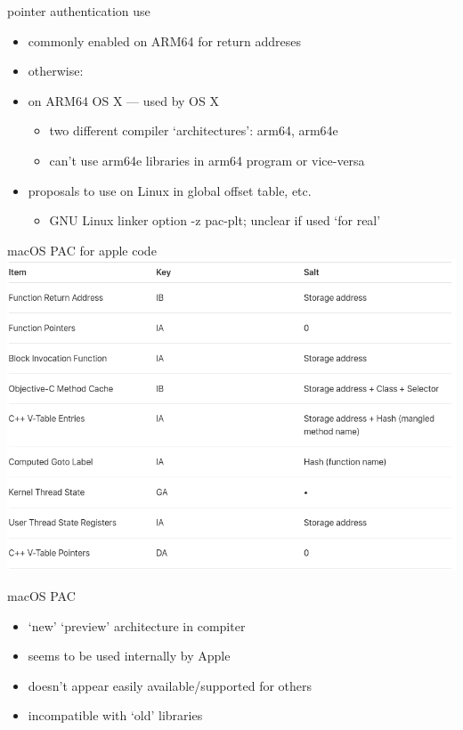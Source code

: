 
\begin{frame}{pointer authentication use}
    \begin{itemize}
    \item commonly enabled on ARM64 for return addreses
    \vspace{.25cm}
    \item otherwise:
    \item on ARM64 OS X --- used by OS X
        \begin{itemize}
        \item two different compiler `architectures': arm64, arm64e
        \item can't use arm64e libraries in arm64 program or vice-versa
        \end{itemize}
    \item proposals to use on Linux in global offset table, etc.
        \begin{itemize}
        \item GNU Linux linker option -z pac-plt; unclear if used `for real'
        \end{itemize}
    \end{itemize}
\end{frame}

\begin{frame}[fragile]{macOS PAC for apple code}
\includegraphics[height=0.9\textheight]{../cfi/apple-pac-usage}
\end{frame}

\begin{frame}{macOS PAC}
    \begin{itemize}
    \item `new' `preview' architecture in compiter
    \item seems to be used internally by Apple
    \item doesn't appear easily available/supported for others
    \item incompatible with `old' libraries
    \end{itemize}
\end{frame}

